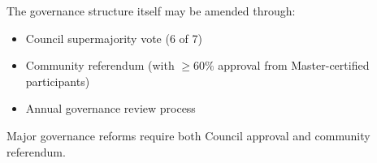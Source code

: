 The governance structure itself may be amended through:
\begin{itemize}[leftmargin=*]
  \item Council supermajority vote (6 of 7)
  \item Community referendum (with $\geq 60\%$ approval from Master-certified participants)
  \item Annual governance review process
\end{itemize}

Major governance reforms require both Council approval and community referendum.

